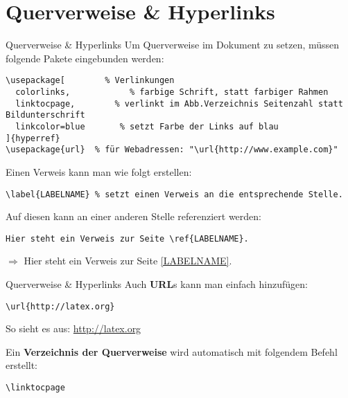 \section{Querverweise \& Hyperlinks}
\begin{frame}[fragile]{Querverweise \& Hyperlinks}
Um Querverweise im Dokument zu setzen, müssen folgende Pakete eingebunden werden:
\begin{lstlisting}[style=tex]
\usepackage[        % Verlinkungen
  colorlinks,            % farbige Schrift, statt farbiger Rahmen
  linktocpage,        % verlinkt im Abb.Verzeichnis Seitenzahl statt Bildunterschrift
  linkcolor=blue       % setzt Farbe der Links auf blau
]{hyperref}
\usepackage{url}  % für Webadressen: "\url{http://www.example.com}"
\end{lstlisting}%

\bigskip
Einen Verweis\label{LABELNAME} kann man wie folgt erstellen:
\begin{lstlisting}[style=tex]
\label{LABELNAME} % setzt einen Verweis an die entsprechende Stelle.
\end{lstlisting}

Auf diesen kann an einer anderen Stelle referenziert werden:
\begin{lstlisting}[style=tex]
Hier steht ein Verweis zur Seite \ref{LABELNAME}.
\end{lstlisting}%

\bigskip
$\Rightarrow$ Hier steht ein Verweis zur Seite \ref{LABELNAME}.
\end{frame}

\begin{frame}[fragile]{Querverweise \& Hyperlinks}
Auch \textbf{URL}s kann man einfach hinzufügen:
\begin{lstlisting}[style=tex]
\url{http://latex.org}
\end{lstlisting}
So sieht es aus: \url{http://latex.org}%

\bigskip
Ein \textbf{Verzeichnis der Querverweise} wird automatisch mit folgendem Befehl erstellt:
\begin{lstlisting}[style=tex]
\linktocpage
\end{lstlisting}
\end{frame}
